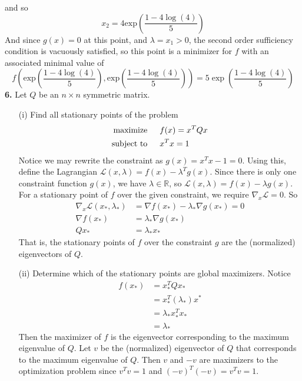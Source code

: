 \documentclass{article}
\begin{document}
and so
\[x_2 = 4\text{exp}\left(\frac{1 - 4\log(4)}{5}\right)\]
And since $g(x) = 0$ at this point, and $\lambda = x_1 > 0$, the second order sufficiency condition is vacuously satisfied, so this point is a minimizer for $f$ with an associated minimal value of 
\[f\left(\text{exp}\left(\frac{1-4\log(4)}{5}\right), \text{exp}\left(\frac{1-4\log(4)}{5}\right)\right) = 5\exp{\left(\frac{1-4\log(4)}{5}\right)}\]
\newline\newline
\textbf{6.} Let $Q$ be an $n \times n$ symmetric matrix.
\begin{itemize}
    \item[(i)] Find all stationary points of the problem 
    \begin{align*}
        \text{maximize} \hspace{1.5em} &f(x) = x^TQx\\
        \text{subject to} \hspace{1.5em} &x^Tx = 1
    \end{align*}
    Notice we may rewrite the constraint as $g(x) = x^Tx - 1 = 0$. Using this, define the Lagrangian $\mathscr{L}(x,\lambda) = f(x) - \lambda^Tg(x)$. Since there is only one constraint function $g(x)$, we have $\lambda \in \mathbb{R}$, so $\mathscr{L}(x,\lambda) = f(x) - \lambda g(x)$. For a stationary point of $f$ over the given constraint, we require $\nabla_x\mathscr{L} = 0$. So
    \begin{align*}
        \nabla_x\mathscr{L}(x_*,\lambda_*) &= \nabla f(x_*) - \lambda_*\nabla g(x_*) = 0\\
        \nabla f(x_*) &= \lambda_*\nabla g(x_*)\\
        Qx_* &= \lambda_*x_*
    \end{align*}
    That is, the stationary points of $f$ over the constraint $g$ are the (normalized) eigenvectors of $Q$.
    \item[(ii)] Determine which of the stationary points are global maximizers.
    \newline\newline
    Notice
    \begin{align*}
        f(x_*) &= x_*^TQx_*\\
        &= x_*^T(\lambda_*)x^*\\
        &= \lambda_*x_*^Tx_*\\
        &= \lambda_*
    \end{align*}
    Then the maximizer of $f$ is the eigenvector corresponding to the maximum eigenvalue of $Q$. Let $v$ be the (normalized) eigenvector of $Q$ that corresponds to the maximum eigenvalue of $Q$. Then $v$ and $-v$ are maximizers to the optimization problem since $v^Tv = 1$ and $(-v)^T(-v) = v^Tv = 1$. 


\end{itemize}
\end{document}
